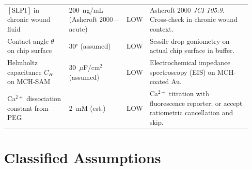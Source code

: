 \documentclass[10pt,a4paper]{article}
\begin{document}
\begin{table}[H]
{\begin{tabularx}{\linewidth}{p{3.6cm}p{2.8cm}p{1.4cm}p{6.0cm}}
$[\text{SLPI}]$ in chronic wound fluid & 200~ng/mL (Ashcroft 2000 -- acute) & LOW & Ashcroft 2000 \textit{JCI 105:9}. Cross-check in chronic wound context. \\
Contact angle $\theta$ on chip surface & 30$^\circ$ (assumed) & LOW & Sessile drop goniometry on actual chip surface in buffer. \\
Helmholtz capacitance $C_H$ on MCH-SAM & 30~$\mu$F/cm$^2$ (assumed) & LOW & Electrochemical impedance spectroscopy (EIS) on MCH-coated Au. \\
Ca$^{2+}$ dissociation constant from PEG & 2~mM (est.) & LOW & Ca$^{2+}$ titration with fluorescence reporter; or accept ratiometric cancellation and skip. \\
\bottomrule
\end{tabularx}
}
\end{table}

\section{Classified Assumptions}
\end{document}
